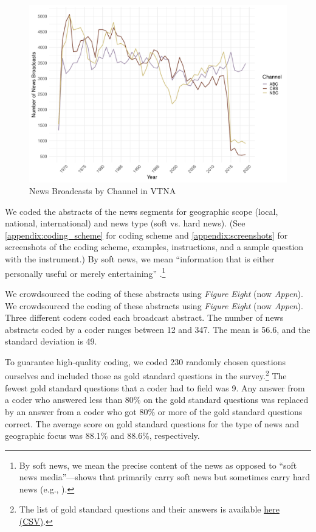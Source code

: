 \documentclass[12pt, letterpaper]{article}
\begin{document}
\begin{figure}[H]
  \centering
  \caption{News Broadcasts by Channel in VTNA}
  \label{fig:vandy_channel}
  \includegraphics[width=.95\linewidth]{../figs/fig_channel_total.pdf}
\end{figure}

We coded the abstracts of the news segments for geographic scope (local, national, international) and news type (soft vs. hard news). (See \ref{appendix:coding_scheme} for coding scheme and \ref{appendix:screenshots} for screenshots of the coding scheme, examples, instructions, and a sample question with the instrument.) By soft news, we mean ``information that is either personally useful or merely entertaining'' \citep{zaller2003new}.\footnote{By soft news, we mean the precise content of the news as opposed to ``soft news media''---shows that primarily carry soft news but sometimes carry hard news (e.g., \cite{baum2006oprah}).}

We crowdsourced the coding of these abstracts using \textit{Figure Eight} (now \textit{Appen}). We crowdsourced the coding of these abstracts using \textit{Figure Eight} (now \textit{Appen}). Three different coders coded each broadcast abstract. The number of news abstracts coded by a coder ranges between 12 and 347. The mean is 56.6, and the standard deviation is 49.

To guarantee high-quality coding, we coded 230 randomly chosen questions ourselves and included those as gold standard questions in the survey.\footnote{The list of gold standard questions and their answers is available \href{https://github.com/notnews/notwork_news/blob/master/data/sample_questions_gold.csv}{here (CSV)}.} The fewest gold standard questions that a coder had to field was 9. Any answer from a coder who answered less than 80\% on the gold standard questions was replaced by an answer from a coder who got 80\% or more of the gold standard questions correct. The average score on gold standard questions for the type of news and geographic focus was 88.1\% and 88.6\%, respectively.
\end{document}
